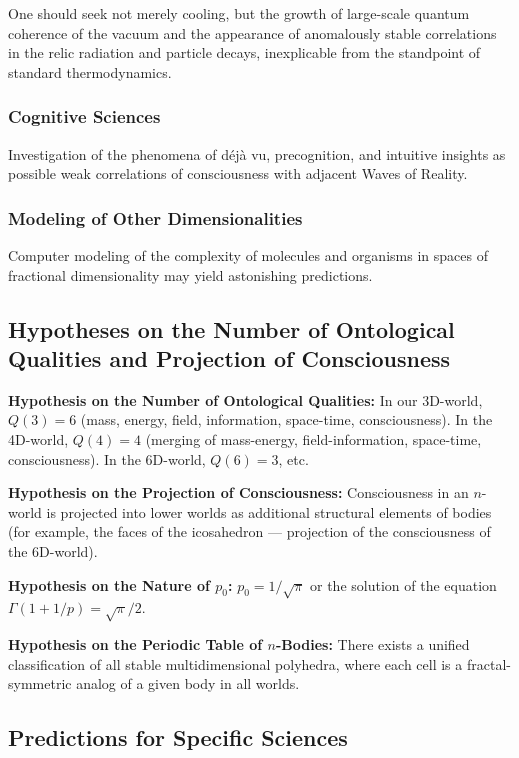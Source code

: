 \documentclass[a4paper,12pt]{article}
\begin{document}
	One should seek not merely cooling, but the growth of large-scale quantum coherence of the vacuum and the appearance of anomalously stable correlations in the relic radiation and particle decays, inexplicable from the standpoint of standard thermodynamics.
	
	\subsubsection{Cognitive Sciences}
	
	Investigation of the phenomena of déjà vu, precognition, and intuitive insights as possible weak correlations of consciousness with adjacent Waves of Reality.
	
	\subsubsection{Modeling of Other Dimensionalities}
	
	Computer modeling of the complexity of molecules and organisms in spaces of fractional dimensionality may yield astonishing predictions.
	
	\subsection{Hypotheses on the Number of Ontological Qualities and Projection of Consciousness}
	
	\textbf{Hypothesis on the Number of Ontological Qualities:} In our 3D-world, $Q(3) = 6$ (mass, energy, field, information, space-time, consciousness). In the 4D-world, $Q(4) = 4$ (merging of mass-energy, field-information, space-time, consciousness). In the 6D-world, $Q(6) = 3$, etc.
	
	\textbf{Hypothesis on the Projection of Consciousness:} Consciousness in an $n$-world is projected into lower worlds as additional structural elements of bodies (for example, the faces of the icosahedron — projection of the consciousness of the 6D-world).
	
	\textbf{Hypothesis on the Nature of $p_0$:} $p_0 = 1/\sqrt{\pi}$ or the solution of the equation $\Gamma(1+1/p) = \sqrt{\pi}/2$.
	
	\textbf{Hypothesis on the Periodic Table of $n$-Bodies:} There exists a unified classification of all stable multidimensional polyhedra, where each cell is a fractal-symmetric analog of a given body in all worlds.
	
	\subsection{Predictions for Specific Sciences}
	
\end{document}
